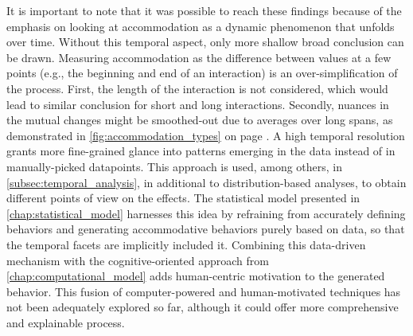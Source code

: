 It is important to note that it was possible to reach these findings because of the emphasis on looking at accommodation as a dynamic phenomenon that unfolds over time.
Without this temporal aspect, only more shallow broad conclusion can be drawn.
Measuring accommodation as the difference between values at a few points (e.g., the beginning and end of an interaction) is an over-simplification of the process.
First, the length of the interaction is not considered, which would lead to similar conclusion for short and long interactions.
Secondly, nuances in the mutual changes might be smoothed-out due to averages over long spans, as demonstrated in \cref{fig:accommodation_types} on page \pageref{fig:accommodation_types}.
A high temporal resolution grants more fine-grained glance into patterns emerging in the data instead of in manually-picked datapoints.
This approach is used, among others, in \cref{subsec:temporal_analysis}, in additional to distribution-based analyses, to obtain different points of view on the effects.
The statistical model presented in \cref{chap:statistical_model} harnesses this idea by refraining from accurately defining behaviors and generating accommodative behaviors purely based on data, so that the temporal facets are implicitly included it.
Combining this data-driven mechanism with the cognitive-oriented approach from \cref{chap:computational_model} adds human-centric motivation to the generated behavior.
This fusion of computer-powered and human-motivated techniques has not been adequately explored so far, although it could offer more comprehensive and explainable process.

